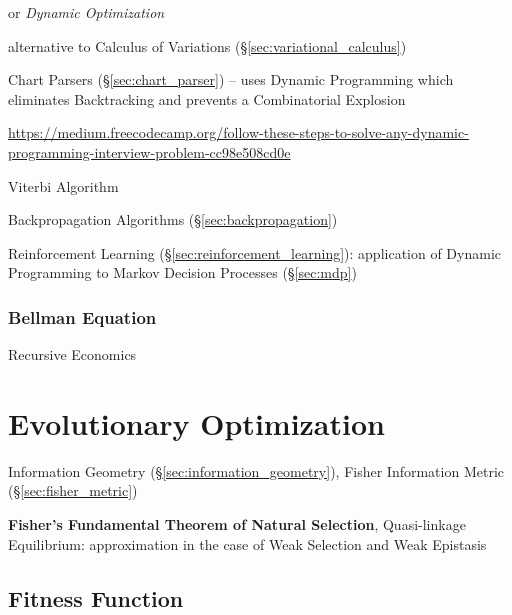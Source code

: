 or \emph{Dynamic Optimization}

alternative to Calculus of Variations (\S\ref{sec:variational_calculus})

\fist Chart Parsers (\S\ref{sec:chart_parser}) -- uses Dynamic Programming which
eliminates Backtracking and prevents a Combinatorial Explosion

\url{https://medium.freecodecamp.org/follow-these-steps-to-solve-any-dynamic-programming-interview-problem-cc98e508cd0e}

Viterbi Algorithm

Backpropagation Algorithms (\S\ref{sec:backpropagation})

\fist Reinforcement Learning (\S\ref{sec:reinforcement_learning}): application
of Dynamic Programming to Markov Decision Processes (\S\ref{sec:mdp})



\subsubsection{Bellman Equation}\label{sec:bellman_equation}

Recursive Economics



\section{Evolutionary Optimization}\label{sec:evolutionary_optimization}

\fist Information Geometry (\S\ref{sec:information_geometry}), Fisher
Information Metric (\S\ref{sec:fisher_metric})

\fist \textbf{Fisher's Fundamental Theorem of Natural Selection},
Quasi-linkage Equilibrium: approximation in the case of Weak Selection
and Weak Epistasis %



\subsection{Fitness Function}\label{sec:fitness_function}

